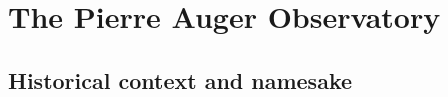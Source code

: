 
\chapter{The Pierre Auger Observatory}
\label{chap:auger-observatory}



\section{Historical context and namesake}
\label{sec:auger-history}




